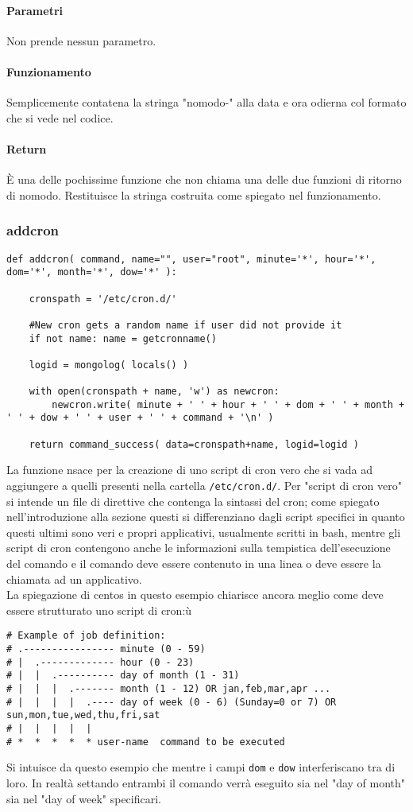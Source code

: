 \documentclass[11pt]{article}
\begin{document}
\paragraph{Parametri}
Non prende nessun parametro.
\paragraph{Funzionamento}
Semplicemente contatena la stringa "nomodo-" alla data e ora odierna col formato che si vede nel codice.
\paragraph{Return}
È una delle pochissime funzione che non chiama una delle due funzioni di ritorno di nomodo.
Restituisce la stringa costruita come spiegato nel funzionamento.

\subsubsection{addcron}\label{addcron}
\begin{lstlisting}
def addcron( command, name="", user="root", minute='*', hour='*', dom='*', month='*', dow='*' ):

    cronspath = '/etc/cron.d/' 

    #New cron gets a random name if user did not provide it
    if not name: name = getcronname()

    logid = mongolog( locals() )

    with open(cronspath + name, 'w') as newcron:
        newcron.write( minute + ' ' + hour + ' ' + dom + ' ' + month + ' ' + dow + ' ' + user + ' ' + command + '\n' )

    return command_success( data=cronspath+name, logid=logid )
\end{lstlisting}
La funzione nsace per la creazione di uno script di cron vero che si vada ad aggiungere a quelli presenti nella cartella
\texttt{/etc/cron.d/}. Per "script di cron vero" si intende un file di direttive che contenga la sintassi del cron; come spiegato
nell'introduzione alla sezione  questi si differenziano dagli script specifici in quanto questi ultimi sono
veri e propri applicativi, usualmente scritti in bash, mentre gli script di cron contengono anche le informazioni
sulla tempistica dell'esecuzione del comando e il comando deve essere contenuto in una linea o deve essere la chiamata
ad un applicativo.\\
La spiegazione di centos in questo esempio chiarisce ancora meglio come deve essere strutturato uno script di cron:ù
\begin{lstlisting}
# Example of job definition:
# .---------------- minute (0 - 59)
# |  .------------- hour (0 - 23)
# |  |  .---------- day of month (1 - 31)
# |  |  |  .------- month (1 - 12) OR jan,feb,mar,apr ...
# |  |  |  |  .---- day of week (0 - 6) (Sunday=0 or 7) OR sun,mon,tue,wed,thu,fri,sat
# |  |  |  |  |
# *  *  *  *  * user-name  command to be executed
\end{lstlisting}
Si intuisce da questo esempio che mentre i campi \texttt{dom} e \texttt{dow} interferiscano tra di loro. In realtà
settando entrambi il comando verrà eseguito sia nel "day of month" sia nel "day of week" specificari.
\end{document}
